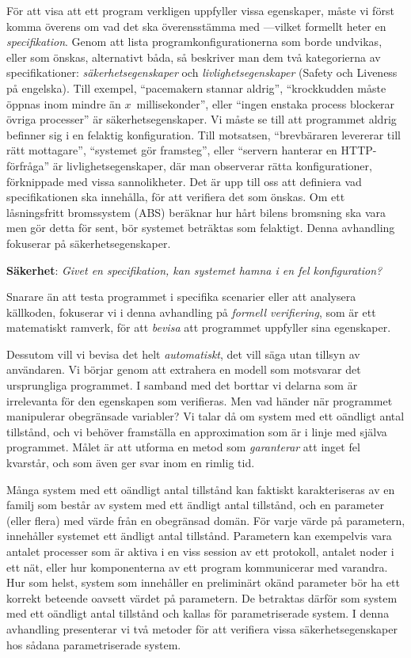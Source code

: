 För att visa att ett program verkligen uppfyller vissa egenskaper,
måste vi först komma överens om vad det ska överensstämma med
---vilket formellt heter en \emph{specifikation}.
%
Genom att lista programkonfigurationerna som borde undvikas, eller som
önskas, alternativt båda, så beskriver man dem två kategorierna av
specifikationer: \emph{säkerhetsegenskaper} och
\emph{livlighetsegenskaper} (Safety och Liveness på engelska).
%
Till exempel, ``pacemakern stannar aldrig'', ``krockkudden måste
öppnas inom mindre än $x$~millisekonder'', eller ``ingen enstaka
process blockerar övriga processer'' är säkerhetsegenskaper.
%
Vi måste se till att programmet aldrig befinner sig i en felaktig
konfiguration.
% 
Till motsatsen, ``brevbäraren levererar till rätt mottagare'',
``systemet gör framsteg'', eller ``servern hanterar en HTTP-förfråga''
är livlighetsegenskaper, där man observerar rätta konfigurationer,
förknippade med vissa sannolikheter.
% 
Det är upp till oss att definiera vad specifikationen ska innehålla, för
att verifiera det som önskas.
% 
Om ett låsningsfritt bromssystem (ABS) %
beräknar hur hårt bilens bromsning ska vara men gör detta för sent,
bör systemet beträktas som felaktigt.
% 
Denna avhandling fokuserar på säkerhetsegenskaper.
\begin{statement}
  {\bf Säkerhet}: %
  {\it Givet en specifikation, kan systemet hamna i en fel konfiguration?}
\end{statement}

Snarare än att testa programmet i specifika scenarier eller att
analysera källkoden, fokuserar vi i denna avhandling på \emph{formell
  verifiering}, som är ett matematiskt ramverk, för att \emph{bevisa}
att programmet uppfyller sina egenskaper.

Dessutom vill vi bevisa det helt \emph{automatiskt}, det vill säga
utan tillsyn av användaren.
%
Vi börjar genom att extrahera en modell som motsvarar det ursprungliga
programmet. I samband med det borttar vi delarna som är irrelevanta
för den egenskapen som verifieras.
%
Men vad händer när programmet manipulerar obegränsade variabler? Vi
talar då om system med ett oändligt antal tillstånd, och vi behöver
framställa en approximation som är i linje med själva programmet.
%
Målet är att utforma en metod som \emph{garanterar} att inget fel
kvarstår, och som även ger svar inom en rimlig tid.

Många system med ett oändligt antal tillstånd kan faktiskt
karakteriseras av en familj som består av system med ett ändligt antal
tillstånd, och en parameter (eller flera) med värde från en obegränsad
domän.
%
För varje värde på parametern, innehåller systemet ett ändligt antal
tillstånd.
%
Parametern kan exempelvis vara
antalet processer som är aktiva i en viss session av ett protokoll, %
antalet noder i ett nät, %
eller hur komponenterna av ett program kommunicerar med varandra.
%
Hur som helst, system som innehåller en preliminärt okänd parameter
bör ha ett korrekt beteende oavsett värdet på parametern. De betraktas
därför som system med ett oändligt antal tillstånd och kallas för
parametriserade system.
I denna avhandling presenterar vi två metoder för att verifiera vissa
säkerhetsegenskaper hos sådana parametriserade system.

